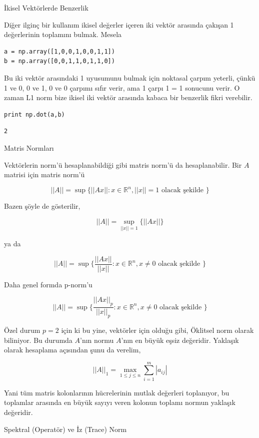 \documentclass[12pt,fleqn]{article}\usepackage{../../common}
\begin{document}
İkisel Vektörlerde Benzerlik

Diğer ilginç bir kullanım ikisel değerler içeren iki vektör arasında
çakışan 1 değerlerinin toplamını bulmak. Mesela 

\begin{verbatim}
a = np.array([1,0,0,1,0,0,1,1])
b = np.array([0,0,1,1,0,1,1,0])
\end{verbatim}

Bu iki vektör arasındaki 1 uyusumunu bulmak için noktasal çarpım yeterli,
çünkü 1 ve 0, 0 ve 1, 0 ve 0 çarpımı sıfır verir, ama 1 çarpı 1 = 1
sonucunu verir. O zaman L1 norm bize ikisel iki vektör arasında kabaca bir
benzerlik fikri verebilir.

\begin{verbatim}
print np.dot(a,b)
\end{verbatim}

\begin{verbatim}
2
\end{verbatim}

Matris Normları

Vektörlerin norm'ü hesaplanabildiği gibi matris norm'ü da hesaplanabilir. Bir
$A$ matrisi için matris norm'ü

$$ || A || = \sup \{ ||Ax|| : x \in \mathbb{R}^n, ||x||=1 \textrm{ olacak şekilde } \} $$

Bazen şöyle de gösterilir,

$$  || A || = \sup_{||x||=1} \{ ||Ax|| \} $$

ya da

$$ || A || = \sup \{ \frac{||Ax||}{||x||} : x \in \mathbb{R}^n, x \ne 0 \textrm{ olacak şekilde } \} $$

Daha genel formda p-norm'u

$$ || A || = \sup
\bigg\{
\frac{||Ax||_p}{||x||_p} : x \in \mathbb{R}^n, x \ne 0 \textrm{ olacak şekilde }
\bigg\} $$

Özel durum $p=2$ için ki bu yine, vektörler için olduğu gibi, Öklitsel norm
olarak biliniyor. Bu durumda $A$'nın normu $A$'nın en büyük eşsiz
değeridir. Yaklaşık olarak hesaplama açısından şunu da verelim,

$$ ||A||_1 = \max_{1 \le j \le n} \sum _{i=1}^{m} |a_{ij}| $$

Yani tüm matris kolonlarının hücrelerinin mutlak değerleri toplanıyor, bu
toplamlar arasında en büyük sayıyı veren kolonun toplamı normun yaklaşık
değeridir.

Spektral (Operatör) ve İz (Trace) Norm
\end{document}
